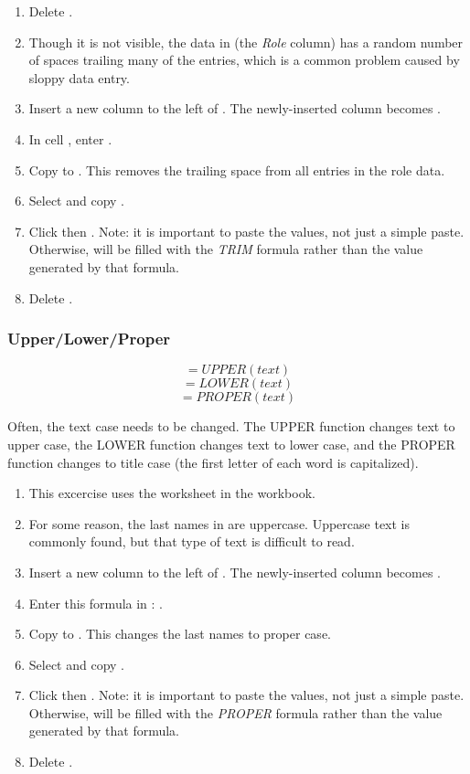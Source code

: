 \begin{enumerate}
	\item Delete .
	\item Though it is not visible, the data in  (the \textit{Role} column) has a random number of spaces trailing many of the entries, which is a common problem caused by sloppy data entry.
	\item Insert a new column to the left of . The newly-inserted column becomes .
	\item In cell , enter .
	\item Copy  to . This removes the trailing space from all entries in the role data.
	\item Select and copy .
	\item Click  then . Note: it is important to paste the values, not just a simple paste. Otherwise,  will be filled with the \textit{TRIM} formula rather than the value generated by that formula.
	\item Delete .
\end{enumerate}

\subsubsection{Upper/Lower/Proper}

\[ =UPPER(text) \]
\[ =LOWER(text) \]
\[ =PROPER(text) \]

Often, the text case needs to be changed. The UPPER function changes text to upper case, the LOWER function changes text to lower case, and the PROPER function changes to title case (the first letter of each word is capitalized). 

\begin{enumerate}
	\item This excercise uses the  worksheet in the  workbook.
	\item For some reason, the last names in  are uppercase. Uppercase text is commonly found, but that type of text is difficult to read.
	\item Insert a new column to the left of . The newly-inserted column becomes .
	\item Enter this formula in : .
	\item Copy  to . This changes the last names to proper case.
	\item Select and copy .
	\item Click  then . Note: it is important to paste the values, not just a simple paste. Otherwise,  will be filled with the \textit{PROPER} formula rather than the value generated by that formula.
	\item Delete .
\end{enumerate}

